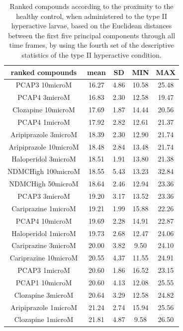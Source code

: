 \documentclass[a4paper,12pt]{article}
\begin{document}
\begin{table}[h!]\tiny
\centering
\caption{Ranked compounds according to the proximity to the healthy control, when administered to the type II hyperactive larvae, based on the Euclidean distances between the first five principal components through all time frames, by using the fourth set of the descriptive statistics of the type II hyperactive condition.}
\begin{tabular}{|c|c|c|c|c|}
\hline
ranked compounds             & mean & SD   & MIN  & MAX   \\ \hline
PCAP3 10microM      & 16.27 & 4.86 & 10.58 & 25.48 \\ \hline
PCAP4 3microM       & 16.83 & 2.30  & 12.58 & 19.47 \\ \hline
Clozapine 10microM    & 17.69 & 1.87 & 14.44 & 20.56 \\ \hline
PCAP4 1microM       & 17.92 & 2.82 & 12.61 & 21.37 \\ \hline
Aripiprazole 3microM  & 18.39 & 2.30  & 12.90  & 21.74 \\ \hline
Aripiprazole 10microM & 18.48 & 2.84 & 13.48 & 21.74 \\ \hline
Haloperidol 3microM   & 18.51 & 1.91 & 13.80  & 21.38 \\ \hline
NDMCHigh 100microM    & 18.55 & 5.43 & 13.23 & 32.84 \\ \hline
NDMCHigh 50microM     & 18.64 & 2.46 & 12.94 & 23.36 \\ \hline
PCAP3 3microM       & 19.20  & 3.17 & 13.52 & 23.36 \\ \hline
Cariprazine 1microM   & 19.21 & 1.99 & 15.88 & 22.26 \\ \hline
PCAP4 10microM      & 19.69 & 2.28 & 14.91 & 22.87 \\ \hline
Haloperidol 1microM   & 19.73 & 2.68 & 12.47 & 24.06 \\ \hline
Cariprazine 3microM   & 20.00    & 3.82 & 9.50   & 24.10  \\ \hline
Cariprazine 10microM  & 20.55 & 4.37 & 11.55 & 24.91 \\ \hline
PCAP3 1microM       & 20.60  & 1.86 & 16.52 & 23.15 \\ \hline
PCAP1 10microM        & 20.60  & 4.13 & 12.08 & 25.55 \\ \hline
Clozapine 3microM     & 20.64 & 3.29 & 12.58 & 24.82 \\ \hline
Aripiprazole 1microM  & 21.24 & 2.74 & 15.94 & 25.56 \\ \hline
Clozapine 1microM     & 21.81 & 4.87 & 9.58  & 26.50  \\ \hline

\end{tabular}
\end{table}
\end{document}
